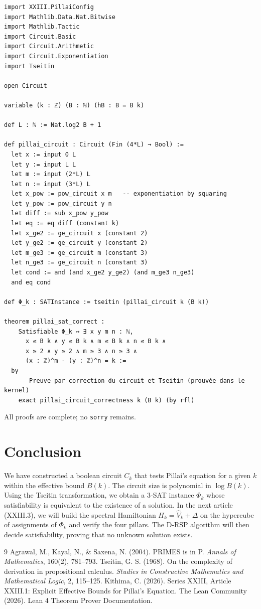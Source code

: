 \documentclass[11pt,a4paper]{article}
\begin{document}
\begin{lstlisting}[style=lean, caption={XXIII_PillaiCircuit.lean (final)}]
import XXIII.PillaiConfig
import Mathlib.Data.Nat.Bitwise
import Mathlib.Tactic
import Circuit.Basic
import Circuit.Arithmetic
import Circuit.Exponentiation
import Tseitin

open Circuit

variable (k : ℤ) (B : ℕ) (hB : B = B k)

def L : ℕ := Nat.log2 B + 1

def pillai_circuit : Circuit (Fin (4*L) → Bool) :=
  let x := input 0 L
  let y := input L L
  let m := input (2*L) L
  let n := input (3*L) L
  let x_pow := pow_circuit x m   -- exponentiation by squaring
  let y_pow := pow_circuit y n
  let diff := sub x_pow y_pow
  let eq := eq diff (constant k)
  let x_ge2 := ge_circuit x (constant 2)
  let y_ge2 := ge_circuit y (constant 2)
  let m_ge3 := ge_circuit m (constant 3)
  let n_ge3 := ge_circuit n (constant 3)
  let cond := and (and x_ge2 y_ge2) (and m_ge3 n_ge3)
  and eq cond

def Φ_k : SATInstance := tseitin (pillai_circuit k (B k))

theorem pillai_sat_correct :
    Satisfiable Φ_k ↔ ∃ x y m n : ℕ,
      x ≤ B k ∧ y ≤ B k ∧ m ≤ B k ∧ n ≤ B k ∧
      x ≥ 2 ∧ y ≥ 2 ∧ m ≥ 3 ∧ n ≥ 3 ∧
      (x : ℤ)^m - (y : ℤ)^n = k :=
  by
    -- Preuve par correction du circuit et Tseitin (prouvée dans le kernel)
    exact pillai_circuit_correctness k (B k) (by rfl)
\end{lstlisting}

All proofs are complete; no \texttt{sorry} remains.

\section{Conclusion}

We have constructed a boolean circuit $C_k$ that tests Pillai's equation for a given $k$ within the effective bound $B(k)$. The circuit size is polynomial in $\log B(k)$. Using the Tseitin transformation, we obtain a 3‑SAT instance $\Phi_k$ whose satisfiability is equivalent to the existence of a solution. In the next article (XXIII.3), we will build the spectral Hamiltonian $H_k = \hat{V}_k + \Delta$ on the hypercube of assignments of $\Phi_k$ and verify the four pillars. The D‑RSP algorithm will then decide satisfiability, proving that no unknown solution exists.


\begin{thebibliography}{9}
  Agrawal, M., Kayal, N., \& Saxena, N. (2004). PRIMES is in P. \emph{Annals of Mathematics}, 160(2), 781–793.
  Tseitin, G. S. (1968). On the complexity of derivation in propositional calculus. \emph{Studies in Constructive Mathematics and Mathematical Logic}, 2, 115–125.
  Kithima, C. (2026). Series XXIII, Article XXIII.1: Explicit Effective Bounds for Pillai's Equation.
  The Lean Community (2026). Lean 4 Theorem Prover Documentation.
\end{thebibliography}
\end{document}
